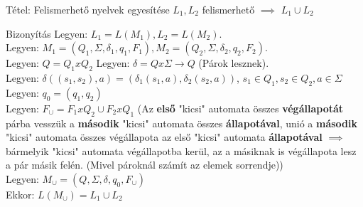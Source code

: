 \documentclass{beamer}
\begin{document}
\begin{frame}
\begin{block}{Tétel: Felismerhető nyelvek egyesítése}
$L_1, L_2$ felismerhető $\implies$ $L_1 \cup L_2$

\end{block}

\begin{block}{Bizonyítás}
Legyen: $L_1 = L(M_1), L_2 = L(M_2)$.\\
Legyen: $M_1 = (Q_1, \Sigma , {\delta}_1, q_1, F_1), M_2 = (Q_2, \Sigma , {\delta}_2, q_2, F_2)$.\\
Legyen: $Q = Q_1 x Q_2$
Legyen: $\delta = Q x \Sigma \rightarrow Q$ (Párok lesznek).\\
Legyen: $\delta((s_1, s_2), a) = ({\delta}_1(s_1, a), {\delta}_2(s_2, a))$, $s_1 \in Q_1, s_2 \in Q_2, a \in \Sigma$\\
\bigskip
Legyen: $q_0 = (q_1, q_2)$\\
Legyen: \underline{\textbf{$F_{\cup} = F_1 x Q_2 \cup F_2 x Q_1$}} (Az \textbf{első} "kicsi" automata összes \textbf{végállapotát} párba vesszük a \textbf{második} "kicsi" automata összes \textbf{állapotával}, unió a \textbf{második} "kicsi" automata összes végállapota az első "kicsi" automata \textbf{állapotával} $\implies$ bármelyik "kicsi" automata végállapotba kerül, az a másiknak is végállapota lesz a pár másik felén. (Mivel pároknál számít az elemek sorrendje))\\
\smallskip
Legyen: $M_{\cup} = (Q, \Sigma , \delta , q_0, F_{\cup})$\\
\bigskip
Ekkor: \underline{$L(M_{\cup}) = L_1 \cup L_2$}\\
\end{block}

\end{frame}
\end{document}
